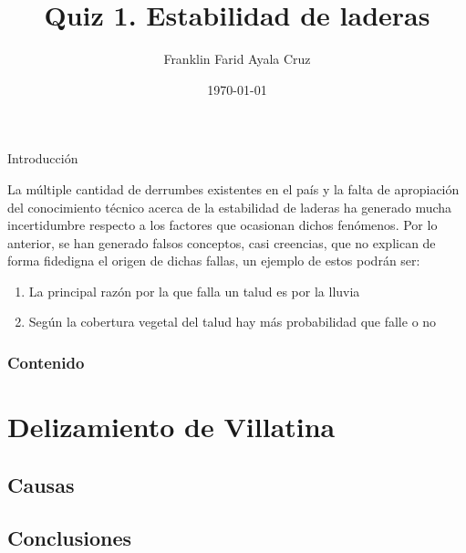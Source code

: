 \documentclass[11pt]{beamer}
\institute[unalmed] 
{
	\vspace*{-0.35cm}
	\texttt{[image: img/logo-unal.png]}
	\vspace*{0.35cm}\\
	Universidad Nacional de Colombia. Sede Medellín
}
\date{\today}
\begin{document}
\title[Presentación parcial]{Quiz 1. Estabilidad de laderas} 

\author[Franklin Farid Ayala Cruz]{Franklin Farid Ayala Cruz} 

\begin{frame}
	\titlepage 
\end{frame}

\begin{frame}{Introducción}

\justify
La múltiple cantidad de derrumbes existentes en el país y la falta de apropiación del conocimiento técnico acerca de la estabilidad de laderas ha generado mucha incertidumbre respecto a los factores que ocasionan dichos fenómenos. Por lo anterior, se han generado falsos conceptos, casi creencias, que no explican de forma fidedigna el origen de dichas fallas, un ejemplo de estos podrán ser:

\begin{enumerate}
	\item La principal razón por la que falla un talud es por la lluvia
	\item Según la cobertura vegetal del talud hay más probabilidad que falle o no
\end{enumerate}

\end{frame}

\begin{frame}
	\frametitle{Contenido} 
	\tableofcontents 
\end{frame}

\section{Delizamiento de Villatina} 
\subsection{Causas}
\subsection{Conclusiones}
\end{document}
